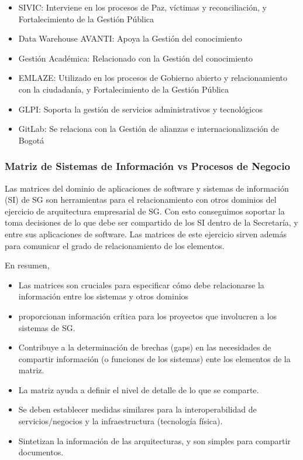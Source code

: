 \documentclass[
	a4paper, %
	12pt, %
]{include/CSSullivanBusinessReport}
\def\tightlist{}
\begin{document}
\begin{itemize}
\item
  SIVIC: Interviene en los procesos de Paz, víctimas y reconciliación, y
  Fortalecimiento de la Gestión Pública
\item
  Data Warehouse AVANTI: Apoya la Gestión del conocimiento
\item
  Gestión Académica: Relacionado con la Gestión del conocimiento
\item
  EMLAZE: Utilizado en los procesos de Gobierno abierto y
  relacionamiento con la ciudadanía, y Fortalecimiento de la Gestión
  Pública
\item
  GLPI: Soporta la gestión de servicios administrativos y tecnológicos
\item
  GitLab: Se relaciona con la Gestión de alianzas e internacionalización
  de Bogotá
\end{itemize}

\subsubsection{Matriz de Sistemas de Información vs Procesos de
Negocio}\label{sec:matriz-de-sistemas-de-informaciuxf3n-vs-procesos-de-negocio}

Las matrices del dominio de aplicaciones de software y sistemas de
información (SI) de SG son herramientas para el relacionamiento con
otros dominios del ejercicio de arquitectura empresarial de SG. Con esto
conseguimos soportar la toma decisiones de lo que debe ser compartido de
los SI dentro de la Secretaría, y entre sus aplicaciones de software.
Las matrices de este ejercicio sirven además para comunicar el grado de
relacionamiento de los elementos.

En resumen,

\begin{itemize}
\tightlist
\item
  Las matrices son cruciales para especificar cómo debe relacionarse la
  información entre los sistemas y otros dominios
\item
  proporcionan información crítica para los proyectos que involucren a
  los sistemas de SG.
\item
  Contribuye a la determinación de brechas (gaps) en las necesidades de
  compartir información (o funciones de los sistemas) ente los elementos
  de la matriz.
\item
  La matriz ayuda a definir el nivel de detalle de lo que se comparte.
\item
  Se deben establecer medidas similares para la interoperabilidad de
  servicios/negocios y la infraestructura (tecnología física).
\item
  Sintetizan la información de las arquitecturas, y son simples para
  compartir documentos.
\end{itemize}
\end{document}
